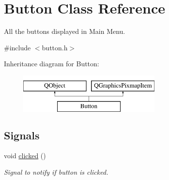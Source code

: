 \hypertarget{classButton}{\section{Button Class Reference}
\label{classButton}
}


All the buttons displayed in Main Menu.  




{\ttfamily \#include $<$button.\-h$>$}

Inheritance diagram for Button\-:\begin{figure}[H]
\begin{center}
\leavevmode
\includegraphics[height=2.000000cm]{classButton}
\end{center}
\end{figure}
\subsection*{Signals}
\begin{DoxyCompactItemize}
\item 
\hypertarget{classButton_a9e7ab4152cb1e7e3beb7f2842f32670c}{void \hyperlink{classButton_a9e7ab4152cb1e7e3beb7f2842f32670c}{clicked} ()}\label{classButton_a9e7ab4152cb1e7e3beb7f2842f32670c}

\begin{DoxyCompactList}\small\item\em Signal to notify if button is clicked. \end{DoxyCompactList}\end{DoxyCompactItemize}
